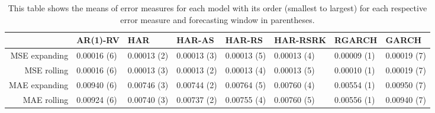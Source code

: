 \begin{table}[ht]
\centering
\begin{tabular}{rlllllll}
  \hline
 & AR(1)-RV & HAR & HAR-AS & HAR-RS & HAR-RSRK & RGARCH & GARCH \\ 
  \hline
MSE expanding & 0.00016 (6) & 0.00013 (2) & 0.00013 (3) & 0.00013 (5) & 0.00013 (4) & 0.00009 (1) & 0.00019 (7) \\ 
  MSE rolling & 0.00016 (6) & 0.00013 (3) & 0.00013 (2) & 0.00013 (4) & 0.00013 (5) & 0.00010 (1) & 0.00019 (7) \\ 
  MAE expanding & 0.00940 (6) & 0.00746 (3) & 0.00744 (2) & 0.00764 (5) & 0.00760 (4) & 0.00554 (1) & 0.00950 (7) \\ 
  MAE rolling & 0.00924 (6) & 0.00740 (3) & 0.00737 (2) & 0.00755 (4) & 0.00760 (5) & 0.00556 (1) & 0.00940 (7) \\ 
   \hline
\end{tabular}
\caption[Error measures means]{This table shows the means of error measures for each model with its order (smallest to largest) for each respective error measure and forecasting window in parentheses. } 
\label{Table:Error_means}
\end{table}
